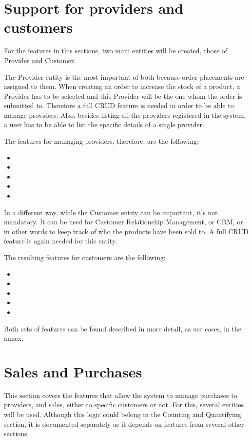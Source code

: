 \section{Support for providers and customers}
For the features in this sections, two main entities will be created, those of Provider and Customer.

The Provider entity is the most important of both because order placements are assigned to them. When creating an order to increase the stock of a product, a Provider has to be selected and this Provider will be the one whom the order is submitted to. Therefore a full CRUD feature is needed in order to be able to manage providers. Also, besides listing all the providers registered in the system, a user has to be able to list the specific details of a single provider.

The features for managing providers, therefore, are the following:

\begin{itemize}
\item {}
\item {}
\item {}
\item {}
\item {}
\end{itemize}

In a different way, while the Customer entity can be important, it’s not mandatory. It can be used for Customer Relationship Management, or CRM, or in other words to keep track of who the products have been sold to. A full CRUD feature is again needed for this entity.

The resulting features for customers are the following:

\begin{itemize}
\item {}
\item {}
\item {}
\item {}
\item {}
\end{itemize}

Both sets of features can be found described in more detail, as use cases, in the annex.

\section{Sales and Purchases}
This section covers the features that allow the system to manage purchases to providers, and sales, either to specific customers or not. For this, several entities will be used. Although this logic could belong in the Counting and Quantifying section, it is documented separately as it depends on features from several other sections. 


